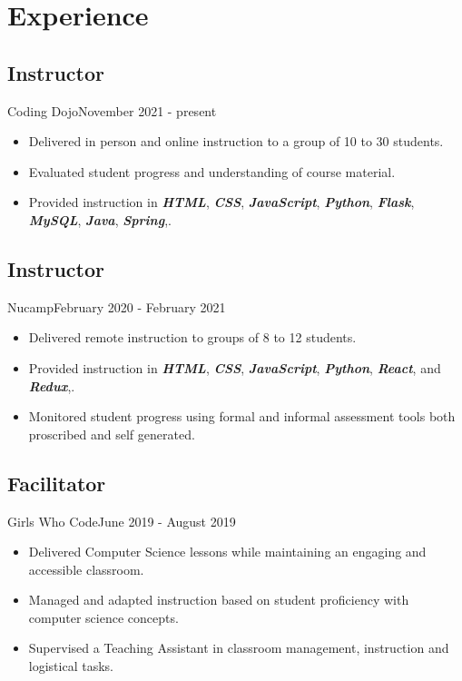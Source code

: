 \section{Experience}
\subsection{Instructor}{Coding Dojo}{November 2021 - present}
\begin{itemize}
\item Delivered in person and online instruction to a group of 10 to 30 students.
\item Evaluated student progress and understanding of course material.
\item Provided instruction in 
\textbf{\emph{HTML}},
\textbf{\emph{CSS}},
\textbf{\emph{JavaScript}},
\textbf{\emph{Python}},
\textbf{\emph{Flask}},
\textbf{\emph{MySQL}},
\textbf{\emph{Java}},
\textbf{\emph{Spring}},.
\end{itemize}

\subsection{Instructor}{Nucamp}{February 2020 - February 2021}
\begin{itemize}
    \item Delivered remote instruction to groups of 8 to 12 students. 
    \item Provided instruction in 
    \textbf{\emph{HTML}},
    \textbf{\emph{CSS}},
    \textbf{\emph{JavaScript}},
    \textbf{\emph{Python}},
    \textbf{\emph{React}}, and
    \textbf{\emph{Redux}},.
    \item Monitored student progress using formal and informal assessment tools both proscribed and self generated.    
\end{itemize}

\subsection{Facilitator}{Girls Who Code}{June 2019 - August 2019}
\begin{itemize}
    \item Delivered Computer Science lessons while maintaining an engaging and accessible classroom. 
    \item Managed and adapted instruction based on student proficiency with computer science concepts.
    \item Supervised a Teaching Assistant in classroom management, instruction and logistical tasks.
\end{itemize}

